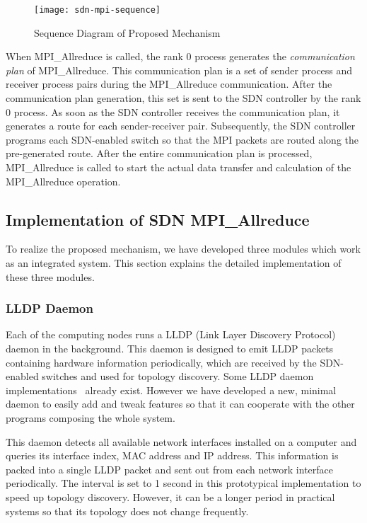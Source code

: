 \begin{figure}
    \centering
    \texttt{[image: sdn-mpi-sequence]}
    \caption{Sequence Diagram of Proposed Mechanism}%
    \label{fig:proposal-sequence}
\end{figure}

When MPI\_Allreduce is called, the rank 0 process generates the
\emph{communication plan} of MPI\_Allreduce. This communication plan is a set
of sender process and receiver process pairs during the MPI\_Allreduce
communication. After the communication plan generation, this set is sent to
the SDN controller by the rank 0 process. As soon as the SDN controller
receives the communication plan, it generates a route for each sender-receiver
pair. Subsequently, the SDN controller programs each SDN-enabled switch so
that the MPI packets are routed along the pre-generated route. After the
entire communication plan is processed, MPI\_Allreduce is called to start the
actual data transfer and calculation of the MPI\_Allreduce operation.

\subsection{Implementation of SDN MPI\_Allreduce}

To realize the proposed mechanism, we have developed three modules which
work as an integrated system. This section explains the detailed
implementation of these three modules.

\subsubsection{LLDP Daemon}

Each of the computing nodes runs a LLDP (Link Layer Discovery
Protocol)~\autocite{lldp} daemon in the background. This daemon is designed to
emit LLDP packets containing hardware information periodically, which are
received by the SDN-enabled switches and used for topology discovery. Some
LLDP daemon implementations~\autocite{lldpd,openlldpd} already exist. However we
have developed a new, minimal daemon to easily add and tweak features so that
it can cooperate with the other programs composing the whole system.

This daemon detects all available network interfaces installed on a
computer and queries its interface index, MAC address and IP address.
This information is packed into a single LLDP packet and sent out from
each network interface periodically. The interval is set to 1 second in
this prototypical implementation to speed up topology discovery.
However, it can be a longer period in practical systems so that its
topology does not change frequently.

